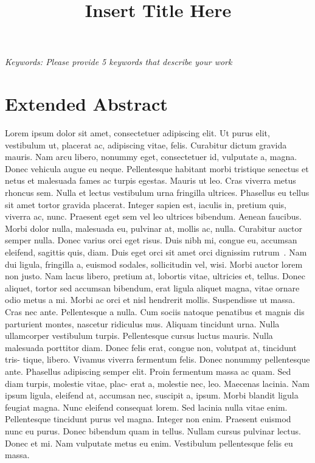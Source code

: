 \documentclass[a4paper,12pt]{article}
\title{Insert Title Here}
\date{}
\begin{document}
\maketitle
\thispagestyle{fancy}

\begin{center}
\textit{Keywords: Please provide 5 keywords that describe your work}\\
\end{center}

\section*{Extended Abstract}
Lorem ipsum dolor sit amet, consectetuer adipiscing elit. Ut purus elit, vestibulum ut, placerat ac, adipiscing vitae, felis. Curabitur dictum gravida mauris. Nam arcu libero, nonummy eget, consectetuer id, vulputate a, magna. Donec vehicula augue eu neque. Pellentesque habitant morbi tristique senectus et netus et malesuada fames ac turpis egestas. Mauris ut leo. Cras viverra metus rhoncus sem. Nulla et lectus vestibulum urna fringilla ultrices. Phasellus eu tellus sit amet tortor gravida placerat. Integer sapien est, iaculis in, pretium quis, viverra ac, nunc. Praesent eget sem vel leo ultrices bibendum. Aenean faucibus. Morbi dolor nulla, malesuada eu, pulvinar at, mollis ac, nulla. Curabitur auctor semper nulla. Donec varius orci eget risus. Duis nibh mi, congue eu, accumsan eleifend, sagittis quis, diam. Duis eget orci sit amet orci dignissim rutrum~\cite{patashnik1984bibtex}. 
Nam dui ligula, fringilla a, euismod sodales, sollicitudin vel, wisi. Morbi auctor lorem non justo. Nam lacus libero, pretium at, lobortis vitae, ultricies et, tellus. Donec aliquet, tortor sed accumsan bibendum, erat ligula aliquet magna, vitae ornare odio metus a mi. Morbi ac orci et nisl hendrerit mollis. Suspendisse ut massa. Cras nec ante. Pellentesque a nulla. Cum sociis natoque penatibus et magnis dis parturient montes, nascetur ridiculus mus. Aliquam tincidunt urna. Nulla ullamcorper vestibulum turpis. Pellentesque cursus luctus mauris. 
Nulla malesuada porttitor diam. Donec felis erat, congue non, volutpat at, tincidunt tris- tique, libero. Vivamus viverra fermentum felis. Donec nonummy pellentesque ante. Phasellus adipiscing semper elit. Proin fermentum massa ac quam. Sed diam turpis, molestie vitae, plac- erat a, molestie nec, leo. Maecenas lacinia. Nam ipsum ligula, eleifend at, accumsan nec, suscipit a, ipsum. Morbi blandit ligula feugiat magna. Nunc eleifend consequat lorem. Sed lacinia nulla vitae enim. Pellentesque tincidunt purus vel magna. Integer non enim. Praesent euismod nunc eu purus. Donec bibendum quam in tellus. Nullam cursus pulvinar lectus. Donec et mi. Nam vulputate metus eu enim. Vestibulum pellentesque felis eu massa. 
\end{document}

